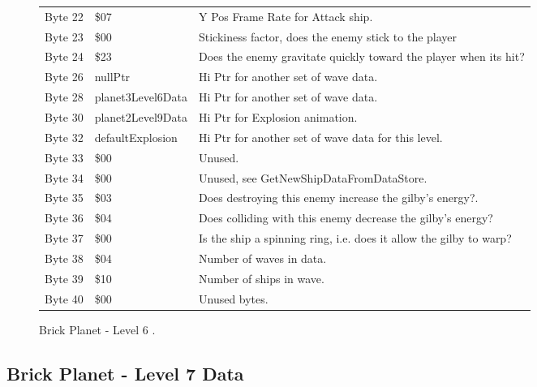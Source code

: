 \begin{figure}[H]
{\begin{adjustbox}{width=12cm}
\begin{tabular}{lll}
 Byte 22 & \$07                     & Y Pos Frame Rate for Attack ship.                                  \\
 Byte 23 & \$00                     & Stickiness factor, does the enemy stick to the player              \\
 Byte 24 & \$23                     & Does the enemy gravitate quickly toward the player when its hit?   \\
 Byte 26 & nullPtr                 & Hi Ptr for another set of wave data.                               \\
 Byte 28 & planet3Level6Data       & Hi Ptr for another set of wave data.                               \\
 Byte 30 & planet2Level9Data       & Hi Ptr for Explosion animation.                                    \\
 Byte 32 & defaultExplosion        & Hi Ptr for another set of wave data for this level.                \\
 Byte 33 & \$00                     & Unused.                                                            \\
 Byte 34 & \$00                     & Unused, see GetNewShipDataFromDataStore.                           \\
 Byte 35 & \$03                     & Does destroying this enemy increase the gilby's energy?.           \\
 Byte 36 & \$04                     & Does colliding with this enemy decrease the gilby's energy?        \\
 Byte 37 & \$00                     & Is the ship a spinning ring, i.e. does it allow the gilby to warp? \\
 Byte 38 & \$04                     & Number of waves in data.                                           \\
 Byte 39 & \$10                     & Number of ships in wave.                                           \\
 Byte 40 & \$00                     & Unused bytes.                                                      \\
\bottomrule
\end{tabular}

  \end{adjustbox}

  }\caption*{Brick Planet - Level 6
.}
\end{figure}

\clearpage
\subsection{Brick Planet - Level 7 Data}

